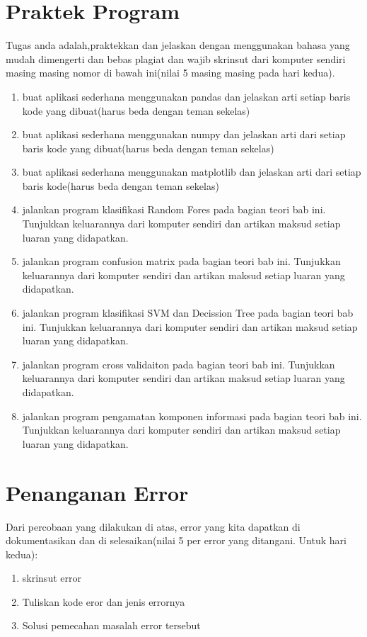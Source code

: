 \section{Praktek Program}
Tugas anda adalah,praktekkan dan jelaskan dengan menggunakan bahasa yang mudah dimengerti dan bebas plagiat dan wajib skrinsut dari komputer sendiri masing masing nomor di bawah ini(nilai 5 masing masing pada hari kedua).

\begin{enumerate}
\item buat aplikasi sederhana menggunakan pandas dan jelaskan arti setiap baris kode yang dibuat(harus beda dengan teman sekelas)
\item buat aplikasi sederhana menggunakan numpy dan jelaskan arti dari setiap baris kode yang dibuat(harus beda dengan teman sekelas)
\item buat aplikasi sederhana menggunakan matplotlib dan jelaskan arti dari setiap baris kode(harus beda dengan teman sekelas)
\item jalankan program klasifikasi Random Fores pada bagian teori bab ini. Tunjukkan keluarannya dari komputer sendiri dan artikan maksud setiap luaran yang didapatkan.
\item jalankan program confusion matrix pada bagian teori bab ini. Tunjukkan keluarannya dari komputer sendiri dan artikan maksud setiap luaran yang didapatkan.
\item jalankan program klasifikasi SVM dan Decission Tree pada bagian teori bab ini. Tunjukkan keluarannya dari komputer sendiri dan artikan maksud setiap luaran yang didapatkan.
\item jalankan program cross validaiton pada bagian teori bab ini. Tunjukkan keluarannya dari komputer sendiri dan artikan maksud setiap luaran yang didapatkan.
\item jalankan program pengamatan komponen informasi pada bagian teori bab ini. Tunjukkan keluarannya dari komputer sendiri dan artikan maksud setiap luaran yang didapatkan.
\end{enumerate}


\section{Penanganan Error}
Dari percobaan yang dilakukan di atas, error yang kita dapatkan di dokumentasikan dan di selesaikan(nilai 5 per error yang ditangani. Untuk hari kedua):

\begin{enumerate}
	\item skrinsut error
	\item Tuliskan kode eror dan jenis errornya
	\item Solusi pemecahan masalah error tersebut
\end{enumerate}

